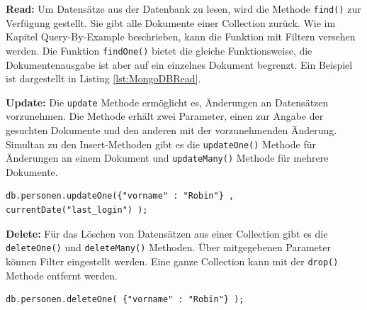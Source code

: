 \noindent
{}
\textbf{Read:}
Um Datensätze aus der Datenbank zu lesen, wird die Methode  \texttt{find()} zur Verfügung gestellt. Sie gibt alle Dokumente einer Collection zurück. Wie im Kapitel Query-By-Example beschrieben, kann die Funktion mit Filtern versehen werden. Die Funktion \texttt{findOne()} bietet die gleiche Funktionsweise, die Dokumentenausgabe ist aber auf ein einzelnes Dokument begrenzt.
Ein Beispiel ist dargestellt in Listing \ref{lst:MongoDBRead}.
\newline\newline

\noindent
{}
\textbf{Update:}
Die \texttt{update} Methode ermöglicht es, Änderungen an Datensätzen vorzunehmen.  Die Methode erhält zwei Parameter, einen zur Angabe der gesuchten Dokumente und den anderen mit  der vorzunehmenden Änderung. Simultan zu den Insert-Methoden gibt es die \texttt{updateOne()} Methode für Änderungen an einem Dokument und \texttt{updateMany()} Methode für mehrere Dokumente.
\newline

\begin{lstlisting}[caption=MongoDB Update, label=lst:MongoDBUpdate]
db.personen.updateOne({"vorname" : "Robin"} , currentDate("last_login") );

\end{lstlisting}

\noindent
{}
\textbf{Delete:}
Für das Löschen von Datensätzen aus einer Collection gibt es die \texttt{deleteOne()} und \texttt{deleteMany()} Methoden. Über mitgegebenen Parameter können Filter eingestellt werden. Eine ganze Collection kann mit der \texttt{drop()}  Methode entfernt werden.
\newline

\begin{lstlisting}[caption=MongoDB Remove, label=lst:MongoDBRemove]
db.personen.deleteOne( {"vorname" : "Robin"} );

\end{lstlisting}

\noindent
